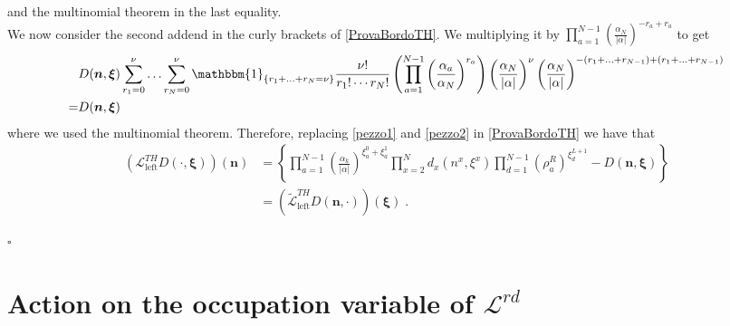 \documentclass[10pt]{article}
\numberwithin{equation}{section}
\numberwithin{equation}{subsection}
\newcommand{\dt}{\;.}
\begin{document}
and the multinomial theorem in the last equality. \\ We now consider the second addend in the curly brackets of \eqref{ProvaBordoTH}.
We multiplying it by $\prod_{a=1}^{N-1}\left(\frac{\alpha_{N}}{|\alpha|}\right)^{-r_{a}+r_{a}}$ to get
\begin{equation}\label{pezzo2}
	\begin{split}
		&D(\bm{n},\bm{\xi})\sum_{r_{1}=0}^{\nu}\ldots\sum_{r_{N}=0}^{\nu}\mathbbm{1}_{\{r_{1}+\ldots+r_{N}=\nu\}}\frac{\nu!}{r_{1}!\cdots r_{N}!}\left(\prod_{a=1}^{N-1}\left(\frac{\alpha_{a}}{\alpha_{N}}\right)^{r_{a}}\right)\left(\frac{\alpha_{N}}{|\alpha|}\right)^{\nu}\left(\frac{\alpha_{N}}{|\alpha|}\right)^{-(r_{1}+\ldots+r_{N-1})+(r_{1}+\ldots+r_{N-1})}\\=&D(\bm{n},\bm{\xi})
	\end{split}
\end{equation} 
where we used the multinomial theorem. Therefore, replacing \eqref{pezzo1} and \eqref{pezzo2} in \eqref{ProvaBordoTH} we have that
\begin{align}
	\left(\mathcal{L}_{\text{left}}^{TH}D(\cdot,\bm{\xi})\right)(\bm{n})&=\left\{\prod_{a=1}^{N-1}\left(\frac{\alpha_{k}}{|\alpha|}\right)^{\xi_{a}^{0}+\xi_{a}^{1}}\prod_{x=2}^{N}d_{x}(n^{x},\xi^{x})\prod_{d=1}^{N-1}(\rho_{a}^{R})^{\xi_{d}^{L+1}}-D(\bm{n},\bm{\xi})\right\}
	\\&=
	\left(\widetilde{\mathcal{L}}_{\text{left}}^{TH}D(\bm{n},\cdot)\right)(\bm{\xi})\dt
\end{align}
\begin{flushright}
	$\square$
\end{flushright}
\section{Action on the occupation variable of $\mathcal{L}^{rd}$}\label{appendix-RD}
\end{document}
